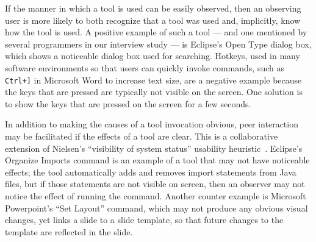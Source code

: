 \documentclass[smallextended]{svjour3}
\newcommand\discovery{peer interaction\xspace}
\begin{document}
 If the manner in which a tool is used can be
easily observed, then an observing user is more likely to
both recognize that a tool was used and, implicitly, know how the tool is used.
A positive example of such a tool --- and one mentioned by several
programmers in our interview study --- is Eclipse's Open Type dialog box, which
shows a noticeable dialog box used for searching.
Hotkeys, used in many software environments so that
users can quickly invoke commands, such as \texttt{Ctrl+]} in Microsoft Word to increase text size, 
are a negative example because the
keys that are pressed are typically not visible on the screen.
One solution is to show the keys that are pressed on the screen for
a few seconds.


In addition to making the causes of a tool invocation obvious, \discovery may
be facilitated if the effects of a tool are clear.
This is a collaborative extension of Nielsen's ``visibility of system status'' 
usability heuristic~\cite{nielsenBook}.
Eclipse's Organize Imports command is an example of a tool that may not have
noticeable effects; the tool automatically adds and removes import statements
from Java files, but if those statements are not visible on screen, then an
observer may not notice the effect of running the command.
Another counter example is Microsoft Powerpoint's ``Set Layout'' command, which may
not produce any obvious visual changes, yet links a slide to a slide template, so that
future changes to the template are reflected in the slide.
\end{document}
